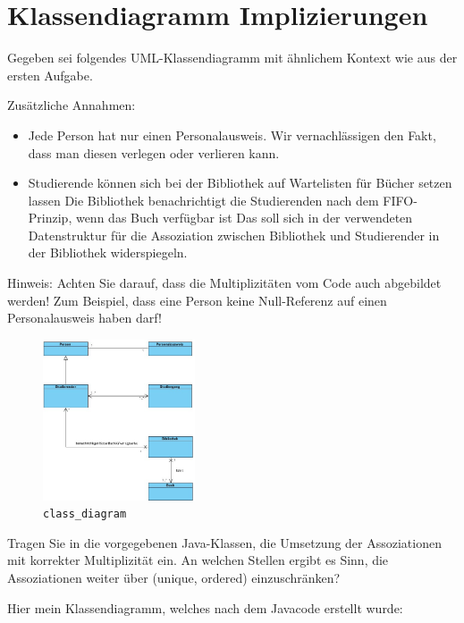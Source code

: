 \documentclass{article}
\begin{document}
    \newpage
    \section*{Klassendiagramm Implizierungen}

    Gegeben sei folgendes UML-Klassendiagramm mit ähnlichem Kontext wie aus der ersten Aufgabe. 

    Zusätzliche Annahmen:
    \begin{itemize}
        \item Jede Person hat nur einen Personalausweis.
            Wir vernachlässigen den Fakt, dass man diesen verlegen oder verlieren kann.
        \item Studierende können sich bei der Bibliothek auf Wartelisten für Bücher setzen lassen
        Die Bibliothek benachrichtigt die Studierenden nach dem FIFO-Prinzip, wenn das Buch verfügbar ist
        Das soll sich in der verwendeten Datenstruktur für die Assoziation zwischen Bibliothek und Studierender in der Bibliothek widerspiegeln.
    \end{itemize}

    Hinweis: Achten Sie darauf, dass die Multiplizitäten vom Code auch abgebildet werden! Zum Beispiel, dass eine Person keine Null-Referenz auf einen Personalausweis haben darf!
    
    \begin{figure}[ht]
        \centering
        \includegraphics[width=0.4\textwidth]{class_diagram.jpg}
        \caption{\texttt{class\_diagram}}
    \end{figure}

    Tragen Sie in die vorgegebenen Java-Klassen, die Umsetzung der Assoziationen mit korrekter Multiplizität ein. An welchen Stellen ergibt es Sinn, die Assoziationen weiter über (unique, ordered) einzuschränken?
    
    Hier mein Klassendiagramm, welches nach dem Javacode erstellt wurde:
\end{document}
